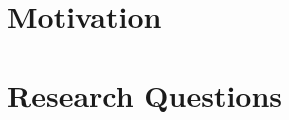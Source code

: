 %
%
\label{chap:intro}
\setcounter{page}{1}
\pagestyle{myheadings}


\newtheorem{definition}{Definition}
\newtheorem{proposition}{Proposition}


\section{Motivation}


\section{Research Questions}



%
%
%
%
%
%
%
%
%
%
%
%
%
%
%
%
%
%



